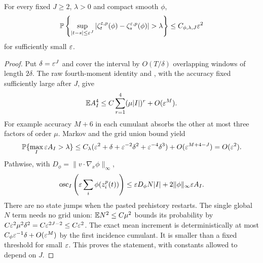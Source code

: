 \begin{proposition}\label{prop:micro}
For every fixed $J\geq2$, $\lambda>0$ and compact smooth $\phi$,
\[
 \Pp\left\{\sup_{|t-s|\leq\eps^J}
       |\zeta_t^{\eps,p}(\phi)-\zeta_s^{\eps,p}(\phi)|>\lambda\right\}
       \leq C_{\phi,\lambda,J}\eps^2
\]
for sufficiently small $\varepsilon$.
\end{proposition}
\begin{proof}
Put $\delta=\varepsilon^J$ and cover the interval by $O(T/\delta)$ overlapping
windows of length $2\delta$. The raw fourth-moment identity and
, with the accuracy fixed sufficiently large after $J$,
give
\[
 \mathbb E A_I^4\leq C\sum_{r=1}^4(\mu|I|)^r+O(\varepsilon^M).
\]
For example accuracy $M+6$ in each cumulant absorbs the other at most
three factors of order $\mu$. Markov and the grid union bound yield
\[
 \mathbb P\{\max_I\varepsilon A_I>\lambda\}
 \leq C_\lambda(\varepsilon^2+\delta+\varepsilon^{-2}\delta^2+
                         \varepsilon^{-4}\delta^3)
       +O(\varepsilon^{M+4-J})=O(\varepsilon^2).
\]
Pathwise, with $D_\phi=\|v\cdot\nabla_x\phi\|_\infty$,
\[
 \operatorname{osc}_I\left(\varepsilon\sum_i\phi(z_i^p(t))\right)
       \leq\varepsilon D_\phi N|I|+2\|\phi\|_\infty\varepsilon A_I.
\]
There are no state jumps when the pasted prehistory restarts.
The single global $N$ term needs no grid union:
$\mathbb E N^2\leq C\mu^2$ bounds its probability by
$C\varepsilon^2\mu^2\delta^2=C\varepsilon^{2J-2}\leq C\varepsilon^2$.
The exact mean increment is deterministically at most
$C_\phi\varepsilon^{-1}\delta+O(\varepsilon^M)$ by the first incidence cumulant.
It is smaller than a fixed threshold for small $\varepsilon$.
This proves the statement, with constants allowed to depend on $J$.
\end{proof}

